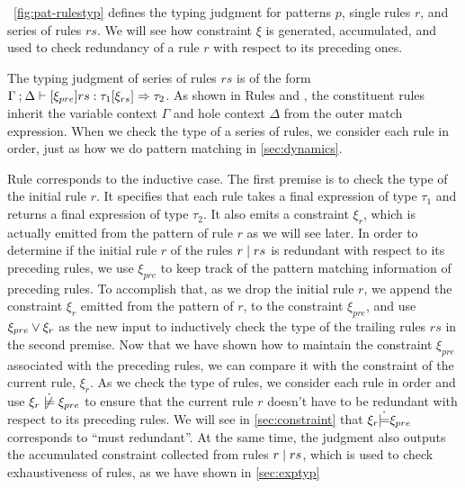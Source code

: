 

\figurename~\ref{fig:pat-rulestyp} defines the typing judgment for patterns $p$,
single rules $r$, and series of rules $rs$. We will see how constraint $\xi$ is
generated, accumulated, and used to check redundancy of a rule $r$ with respect
to its preceding ones.

The typing judgment of series of rules $rs$ is of the form
$\Gamma \mathbin{;} \Delta \vdash [\xi_{pre}] rs : \tau_1 [\xi_{rs}] \Rightarrow \tau_2$. As shown
in Rules \TMatchZPre and \TMatchNZPre, the constituent rules inherit the
variable context $\Gamma$ and hole context $\Delta$ from the outer match
expression. When we check the type of a series of rules, we consider each rule
in order, just as how we do pattern matching in \autoref{sec:dynamics}.

Rule \TRules corresponds to the inductive case. The first premise is to check
the type of the initial rule $r$. It specifies that each rule takes a final expression
of type $\tau_1$ and returns a final expression of type $\tau_2$. It also emits
a constraint $\xi_r$, which is actually emitted from the pattern of rule $r$ as
we will see later. In order to determine if the initial rule $r$ of the rules
$r \mid rs$ is redundant with respect to its preceding rules, we use
$\xi_{pre}$ to keep track of the pattern matching information of preceding
rules. To accomplish that, as we drop the initial rule $r$, we append the
constraint $\xi_r$ emitted from the pattern of $r$, to the constraint
$\xi_{pre}$, and use $\xi_{pre} \vee \xi_r$ as the new input to inductively check the type
of the trailing rules $rs$ in the second premise. Now that we have shown how to maintain the
constraint $\xi_{pre}$ associated with the preceding rules, we can compare it
with the constraint of the current rule, $\xi_r$. As we check the
type of rules, we consider each rule in order and use
$\cnotsatisfy{\xi_r}{\xi_{pre}}$ to ensure that the current rule $r$ doesn't
have to be redundant with respect to its preceding rules. We will see in
\autoref{sec:constraint} that $\xi_r \dot{\models} \xi_{pre}$ corresponds to
``must redundant''. At the same time, the judgment also outputs the accumulated
constraint collected from rules $r \mid rs$, which is used to check
exhaustiveness of rules, as we have shown in \autoref{sec:exptyp}

